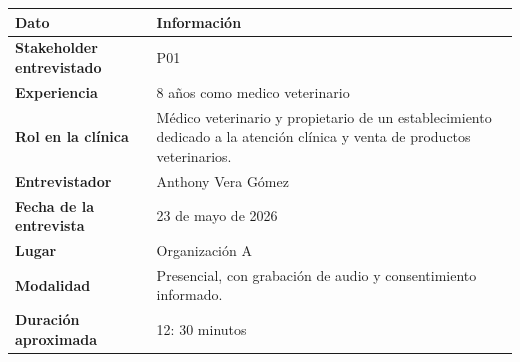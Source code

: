 \documentclass[
]{article}
\newcounter{none} %
\begin{document}
{\def\LTcaptype{none} %
\begin{longtable}[]{|
  >{\raggedright\arraybackslash}p{}|
  >{\raggedright\arraybackslash}p{}|}
\hline
\begin{minipage}[b]{\linewidth}\centering
\textbf{Dato}
\end{minipage} & \begin{minipage}[b]{\linewidth}\centering
\textbf{Información}
\end{minipage} \\
\hline
\endhead
\hline
\endlastfoot
\textbf{Stakeholder entrevistado} &
\begin{minipage}[t]{\linewidth}\raggedright
P01
\end{minipage} \\
\hline
\textbf{Experiencia} & \begin{minipage}[t]{\linewidth}\raggedright
8 años como medico veterinario
\end{minipage} \\
\hline
\textbf{Rol en la clínica} & \begin{minipage}[t]{\linewidth}\raggedright
Médico veterinario y propietario de un establecimiento dedicado a la
atención clínica y venta de productos veterinarios.
\end{minipage} \\
\hline
\textbf{Entrevistador} & \begin{minipage}[t]{\linewidth}\raggedright
Anthony Vera Gómez
\end{minipage} \\
\hline
\textbf{Fecha de la entrevista} &
\begin{minipage}[t]{\linewidth}\raggedright
23 de mayo de 2026
\end{minipage} \\
\hline
\textbf{Lugar} & \begin{minipage}[t]{\linewidth}\raggedright
Organización A
\end{minipage} \\
\hline
\textbf{Modalidad} & \begin{minipage}[t]{\linewidth}\raggedright
Presencial, con grabación de audio y consentimiento informado.
\end{minipage} \\
\hline
\textbf{Duración aproximada} &
\begin{minipage}[t]{\linewidth}\raggedright
12: 30 minutos
\end{minipage} \\

\end{longtable}}
\end{document}
